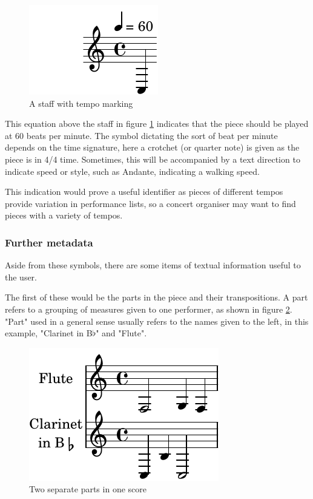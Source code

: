 \begin{figure}[h]
    \centering
        \includegraphics{tempo-crop.pdf}
    \caption{A staff with tempo marking}
    \label{fig:tempo}
\end{figure}

This equation above the staff in figure \ref{fig:tempo} indicates that the piece should be played at 60 beats per minute. The symbol dictating the sort of beat per minute depends on the time signature, here a crotchet (or quarter note) is given as the piece is in 4/4 time. Sometimes, this will be accompanied by a text direction to indicate speed or style, such as Andante, indicating a walking speed.

This indication would prove a useful identifier as pieces of different tempos provide variation in performance lists, so a concert organiser may want to find pieces with a variety of tempos.

\subsubsection{Further metadata}
Aside from these symbols, there are some items of textual information useful to the user. 

The first of these would be the parts in the piece and their transpositions. A part refers to a grouping of measures given to one performer, as shown in figure \ref{fig:parts}. "Part" used in a general sense usually refers to the names given to the left, in this example, "Clarinet in B$\flat$" and "Flute".
\begin{figure}[H]
\centering
\includegraphics{multiparts-crop}
\caption{Two separate parts in one score}
\label{fig:parts}	
\end{figure}



